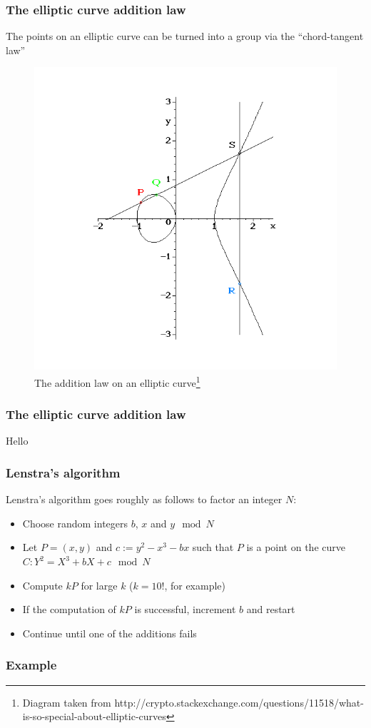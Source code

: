 \documentclass{beamer}
\begin{document}
\begin{frame} %
\frametitle{The elliptic curve addition law}
The points on an elliptic curve can be turned into a group via the ``chord-tangent law''
\begin{figure}[htpb]
	\centering
	\includegraphics[scale=0.25]{addition.png}
	\caption{The addition law on an elliptic curve\footnote{Diagram taken from http://crypto.stackexchange.com/questions/11518/what-is-so-special-about-elliptic-curves}}
\end{figure}
\end{frame}

\begin{frame} %
\frametitle{The elliptic curve addition law}
Hello
\end{frame}

\begin{frame} %
\frametitle{Lenstra's algorithm}
\begin{definition}
	Lenstra's algorithm goes roughly as follows to factor an integer $N$:
	\begin{itemize}
		\item Choose random integers $b$, $x$ and $y \mod N$
		\item Let $P = (x,y)$ and $c:=y^2-x^3-bx$ such that $P$ is a point on the curve $C: Y^2 = X^3 +bX + c \mod N$
		\item Compute $kP$ for large $k$ ($k=10!$, for example)
		\item If the computation of $kP$ is successful, increment $b$ and restart
		\item Continue until one of the additions fails
	\end{itemize}
\end{definition}
\end{frame}

\begin{frame} %
\frametitle{Example}

\end{frame}
\end{document}
